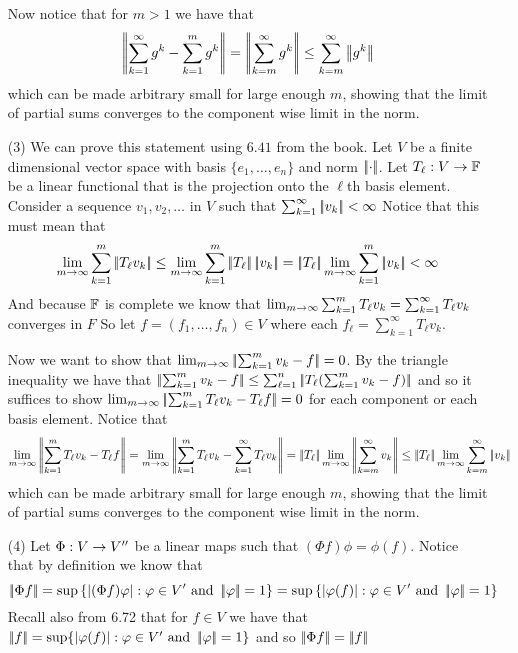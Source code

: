 \documentclass[12pt]{amsart}
\begin{document}
\begin{itemize}
   Now notice that for $m>1$ we have that 
   \[\norm{\sum_{k=1}^\infty g^k-\sum_{k=1}^m g^k}=\norm{\sum_{k=m}^\infty g^k}\leq \sum_{k=m}^\infty\norm{g^k}\]
   which can be made arbitrary small for large enough $m$, showing that the limit of partial sums converges to the component wise limit in the norm.
    


   \item[(3)] We can prove this statement using $6.41$ from the book.
   Let $V$ be a finite dimensional vector space with basis $\{e_1,\dots,e_n\}$
   and norm $\norm{\cdot}$. Let $T_\ell:V\rightarrow \mathbb{F}$ be a linear functional that is the projection onto the $\ell$th basis element. 
   Consider a sequence $v_1,v_2,\dots$ in $V$ such that $\sum_{k=1}^\infty \norm{v_k} < \infty$
   Notice that this must mean that 
   \[\lim_{m\ra \infty}\sum_{k=1}^m \norm{T_\ell v_k}\leq\lim_{m\ra \infty}\sum_{k=1}^m \norm{T_\ell}\norm{v_k}
   =\norm{T_\ell}\lim_{m\ra \infty}\sum_{k=1}^m \norm{v_k}<\infty\]
   And because $\mathbb{F}$ is complete we know that $\lim_{m\rightarrow \infty}\sum_{k=1}^m T_\ell v_k =\sum_{k=1}^\infty T_\ell v_k$ converges in $F$
   So let $f=(f_1,\dots,f_n)\in V$ where each $f_\ell=\sum_{k=1}^\infty T_\ell v_k$.

   Now we want to show that $\lim_{m\ra \infty}\norm{\sum_{k=1}^m v_k-f}=0$. By the triangle inequality we 
   have that $\norm{\sum_{k=1}^m v_k-f}\leq \sum_{\ell=1}^n \norm{T_\ell(\sum_{k=1}^m v_k-f)}$ and so it
   suffices to show $\lim_{m\ra \infty}\norm{\sum_{k=1}^m T_\ell v_k-T_\ell f}=0$ for each component or each basis element.
   Notice that 
   \[\lim_{m\ra \infty}\norm{\sum_{k=1}^m T_\ell v_k-T_\ell f}=\lim_{m\ra \infty}\norm{\sum_{k=1}^m T_\ell v_k- \sum_{k=1}^\infty T_\ell v_k}=\norm{T_\ell}\lim_{m\ra \infty}\norm{\sum_{k=m}^\infty v_k}\leq\norm{T_\ell}\lim_{m\ra \infty}\sum_{k=m}^\infty\norm{ v_k}\]
   which can be made arbitrary small for large enough $m$, showing that the limit of partial sums converges to the component wise limit in the norm.



   \item[(4)] %
   Let $\Phi:V\rightarrow V''$ be a linear maps such that $(\Phi f)\phi= \phi(f)$. Notice that by definition we know 
   that 
   \[\norm{\Phi f}=\sup\left\{|(\Phi f)\phi| :\phi\in V' \text{ and }\norm{\phi}=1\right\}
   =\sup\left\{|\phi(f)| :\phi\in V' \text{ and }\norm{\phi}=1\right\}\]
   Recall also from 6.72 that for $f\in V$ we have that $\norm{f}=\sup\{|\phi(f)|: \phi\in V'\text{ and } \norm{\phi}=1\}$ and so 
   $\norm{\Phi f}=\norm{f}$




\end{itemize}
\end{document}
